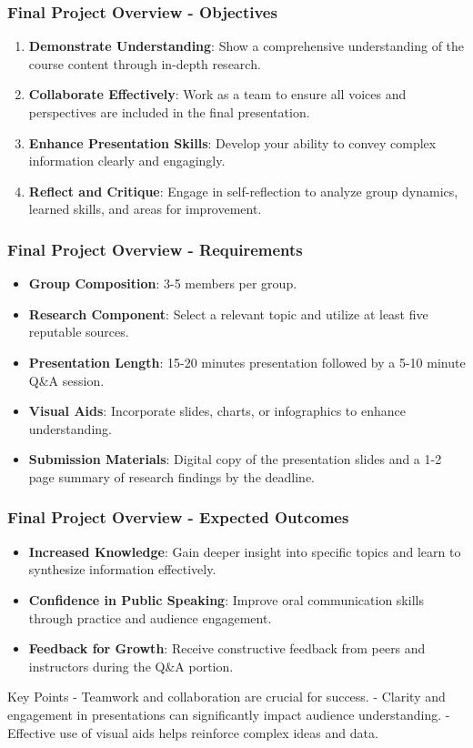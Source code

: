 \documentclass{beamer}
\begin{document}
\begin{frame}[fragile]
    \frametitle{Final Project Overview - Objectives}
    \begin{enumerate}
        \item \textbf{Demonstrate Understanding}: Show a comprehensive understanding of the course content through in-depth research.
        \item \textbf{Collaborate Effectively}: Work as a team to ensure all voices and perspectives are included in the final presentation.
        \item \textbf{Enhance Presentation Skills}: Develop your ability to convey complex information clearly and engagingly.
        \item \textbf{Reflect and Critique}: Engage in self-reflection to analyze group dynamics, learned skills, and areas for improvement.
    \end{enumerate}
\end{frame}

\begin{frame}[fragile]
    \frametitle{Final Project Overview - Requirements}
    \begin{itemize}
        \item \textbf{Group Composition}: 3-5 members per group.
        \item \textbf{Research Component}: Select a relevant topic and utilize at least five reputable sources.
        \item \textbf{Presentation Length}: 15-20 minutes presentation followed by a 5-10 minute Q\&A session.
        \item \textbf{Visual Aids}: Incorporate slides, charts, or infographics to enhance understanding.
        \item \textbf{Submission Materials}: Digital copy of the presentation slides and a 1-2 page summary of research findings by the deadline.
    \end{itemize}
\end{frame}

\begin{frame}[fragile]
    \frametitle{Final Project Overview - Expected Outcomes}
    \begin{itemize}
        \item \textbf{Increased Knowledge}: Gain deeper insight into specific topics and learn to synthesize information effectively.
        \item \textbf{Confidence in Public Speaking}: Improve oral communication skills through practice and audience engagement.
        \item \textbf{Feedback for Growth}: Receive constructive feedback from peers and instructors during the Q\&A portion.
    \end{itemize}
    
    \begin{block}{Key Points}
        - Teamwork and collaboration are crucial for success.
        - Clarity and engagement in presentations can significantly impact audience understanding.
        - Effective use of visual aids helps reinforce complex ideas and data.
    \end{block}
\end{frame}
\end{document}
